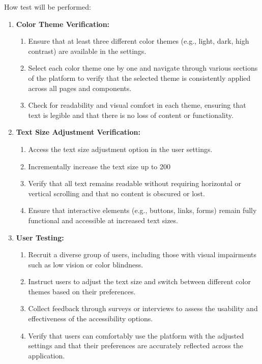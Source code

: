 \documentclass[12pt, titlepage]{article}
\begin{document}
\begin{enumerate}
How test will be performed:
\begin{enumerate}
    \item \textbf{Color Theme Verification:}
    \begin{enumerate}
        \item Ensure that at least three different color themes (e.g., light, dark, high contrast) are available in the settings.
        \item Select each color theme one by one and navigate through various sections of the platform to verify that the selected theme is consistently applied across all pages and components.
        \item Check for readability and visual comfort in each theme, ensuring that text is legible and that there is no loss of content or functionality.
    \end{enumerate}
    \item \textbf{Text Size Adjustment Verification:}
    \begin{enumerate}
        \item Access the text size adjustment option in the user settings.
        \item Incrementally increase the text size up to 200%
        \item Verify that all text remains readable without requiring horizontal or vertical scrolling and that no content is obscured or lost.
        \item Ensure that interactive elements (e.g., buttons, links, forms) remain fully functional and accessible at increased text sizes.
    \end{enumerate}
    \item \textbf{User Testing:}
    \begin{enumerate}
        \item Recruit a diverse group of users, including those with visual impairments such as low vision or color blindness.
        \item Instruct users to adjust the text size and switch between different color themes based on their preferences.
        \item Collect feedback through surveys or interviews to assess the usability and effectiveness of the accessibility options.
        \item Verify that users can comfortably use the platform with the adjusted settings and that their preferences are accurately reflected across the application.
    \end{enumerate}

\end{enumerate}
\end{enumerate}
\end{document}
